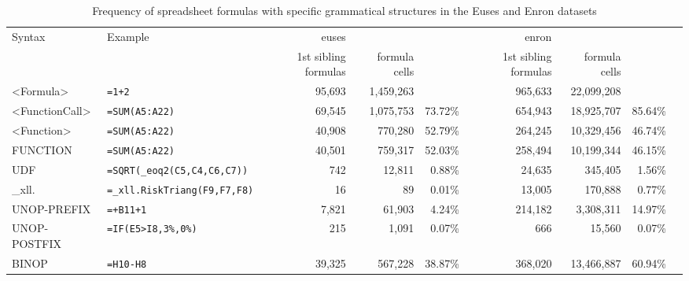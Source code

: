 \documentclass[conference]{IEEEtran}
\begin{document}
\begin{table*}
	\label{table:occurences}
	\caption{Frequency of spreadsheet formulas with specific grammatical structures in the Euses and Enron datasets}
	\begin{tabular}{llrrrrrrr}
		\hline
		Syntax & Example & euses &  &  & enron &  & \\
		&  & 1st sibling formulas & formula cells &  & 1st sibling formulas & formula cells & \\
		\hline
		<Formula> & \texttt{=1+2} & 95,693 & 1,459,263 &  & 965,633 & 22,099,208 & \\
		<FunctionCall> & \texttt{=SUM(A5:A22)} & 69,545 & 1,075,753 & 73.72\% & 654,943 & 18,925,707 & 85.64\%\\
		<Function> & \texttt{=SUM(A5:A22)} & 40,908 & 770,280 & 52.79\% & 264,245 & 10,329,456 & 46.74\%\\
		FUNCTION & \texttt{=SUM(A5:A22)} & 40,501 & 759,317 & 52.03\% & 258,494 & 10,199,344 & 46.15\%\\
		UDF & \texttt{=SQRT(_eoq2(C5,C4,C6,C7))} & 742 & 12,811 & 0.88\% & 24,635 & 345,405 & 1.56\%\\
		_xll. & \texttt{=_xll.RiskTriang(F9,F7,F8)} & 16 & 89 & 0.01\% & 13,005 & 170,888 & 0.77\%\\
		UNOP-PREFIX & \texttt{=+B11+1} & 7,821 & 61,903 & 4.24\% & 214,182 & 3,308,311 & 14.97\%\\
		UNOP-POSTFIX & \texttt{=IF(E5>I8,3\%,0\%)} & 215 & 1,091 & 0.07\% & 666 & 15,560 & 0.07\%\\
			BINOP & \texttt{=H10-H8} & 39,325 & 567,228 & 38.87\% & 368,020 & 13,466,887 & 60.94\%\\
			

\end{tabular}
\end{table*}
\end{document}
